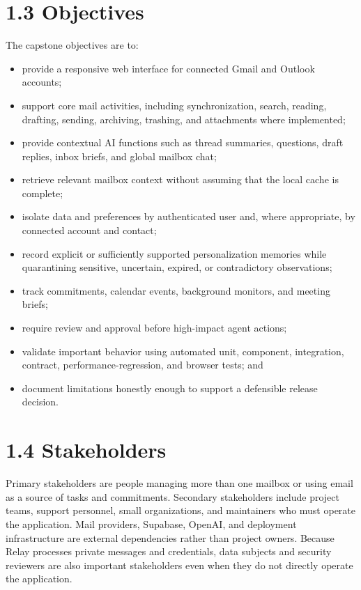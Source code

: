 \documentclass[
]{report}
\providecommand{\tightlist}{%
  \setlength{\itemsep}{0pt}\setlength{\parskip}{0pt}}
\begin{document}
\section{1.3 Objectives}\label{13-objectives}

The capstone objectives are to:

\begin{itemize}
\tightlist
\item
  provide a responsive web interface for connected Gmail and Outlook
  accounts;
\item
  support core mail activities, including synchronization, search,
  reading, drafting, sending, archiving, trashing, and attachments where
  implemented;
\item
  provide contextual AI functions such as thread summaries, questions,
  draft replies, inbox briefs, and global mailbox chat;
\item
  retrieve relevant mailbox context without assuming that the local
  cache is complete;
\item
  isolate data and preferences by authenticated user and, where
  appropriate, by connected account and contact;
\item
  record explicit or sufficiently supported personalization memories
  while quarantining sensitive, uncertain, expired, or contradictory
  observations;
\item
  track commitments, calendar events, background monitors, and meeting
  briefs;
\item
  require review and approval before high-impact agent actions;
\item
  validate important behavior using automated unit, component,
  integration, contract, performance-regression, and browser tests; and
\item
  document limitations honestly enough to support a defensible release
  decision.
\end{itemize}

\section{1.4 Stakeholders}\label{14-stakeholders}

Primary stakeholders are people managing more than one mailbox or using
email as a source of tasks and commitments. Secondary stakeholders
include project teams, support personnel, small organizations, and
maintainers who must operate the application. Mail providers, Supabase,
OpenAI, and deployment infrastructure are external dependencies rather
than project owners. Because Relay processes private messages and
credentials, data subjects and security reviewers are also important
stakeholders even when they do not directly operate the application.
\end{document}

